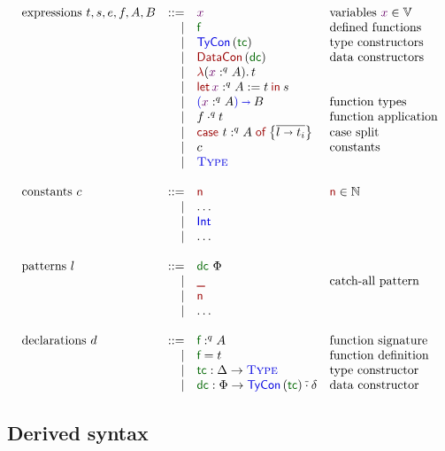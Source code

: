 \documentclass{article}
\newcommand{\OF}{:}
\newcommand{\OFq}[1]{\OF^{#1}}
\newcommand{\type}[1]{{\textcolor{type}{\textsf{#1}}}}
\newcommand{\term}[1]{{\textcolor{term}{\textsf{#1}}}}
\newcommand{\definition}[1]{{\textcolor{definition}{\textsf{#1}}}}
\newcommand{\unv}[1]{{\textcolor{type}{\textsc{#1}}}}
\newcommand{\name}[1]{{\textcolor{neutral}{#1}}}
\newcommand{\Type}{\unv{Type}}
\newcommand{\To}{\mathbin{\textcolor{type}{\shortrightarrow}}}
\newcommand{\App}[3]{#2 \mathbin{\cdot^{#1}} #3}
\newcommand{\AppTele}[2]{#1 \mathbin{\overline{\cdot}} #2}
\newcommand{\TyCon}[1]{\type{TyCon}\left({\definition {#1}}\right)}
\newcommand{\DataCon}[1]{\term{DataCon}\left({\definition {#1}}\right)}
\newcommand{\lam}[3]{\textcolor{term}{\lambda} {(\name {#1} \OFq {#2} {#3})}.\,}
\newcommand{\Let}[5]{\term{let}\, {\name #1} \OFq {#2} {#3} := {#4} \mathbin{\term{in}} {#5}}
\newcommand{\Case}[4]{\term{case}~ {#1} \OFq {#2} {#3} \mathrel{\term{of}} \left\{\overline{#4}\right\}}
\newcommand{\Clause}[2]{{#1} \shortrightarrow {#2}}
\newcommand{\PiT}[4]{\textcolor{type}{(}\name #1 \OF^{#2} #3 \textcolor{type}{)} \To #4}
\begin{document}
$$
\begin{array}{lrll}
  \text{expressions } {t, s, e, f, A, B} &\mathrel{\text{::=}} &\name x & \text{variables ${\name x} \in \mathbb V$}\\
  &\mid &\definition f & \text{defined functions}\\
  &\mid &\TyCon {\definition tc} & \text{type constructors}\\
  &\mid &\DataCon {\definition dc} & \text{data constructors}\\
  &\mid &\lam x q A t\\
  &\mid &\Let x q A t s\\
  &\mid &\PiT x q A B & \text{function types}\\
  &\mid &\App q f t & \text{function application}\\
  &\mid &\Case t q A {\Clause l {t_i}} & \text{case split}\\
  &\mid &c & \text{constants}\\
  &\mid &\Type\\
  \\
  \text{constants } {c} &\mathrel{\text{::=}} &\term{n} & \text{$\term{n} \in \mathbb N$}\\
  &\mid &\ldots\\
  &\mid &\type{Int}\\
  &\mid &\ldots\\
  \\
  \text{patterns } {l} &\mathrel{\text{::=}} &\definition{dc}~ \Phi \\
  &\mid &\term{\_} & \text{catch-all pattern} \\
  &\mid &\term{n}\\
  &\mid &\ldots\\
  \\
  \text{declarations } {d} &\mathrel{\text{::=}} &\definition f \OFq q A & \text{function signature}\\
  &\mid &\definition f = t & \text{function definition}\\
  &\mid &\definition{tc} \OF \Delta \to \Type & \text{type constructor}\\
  &\mid &\definition{dc} \OF \Phi \to \AppTele {\TyCon {\definition {tc}}} \delta  & \text{data constructor}
\end{array}
$$

\subsection{Derived syntax}
\end{document}
